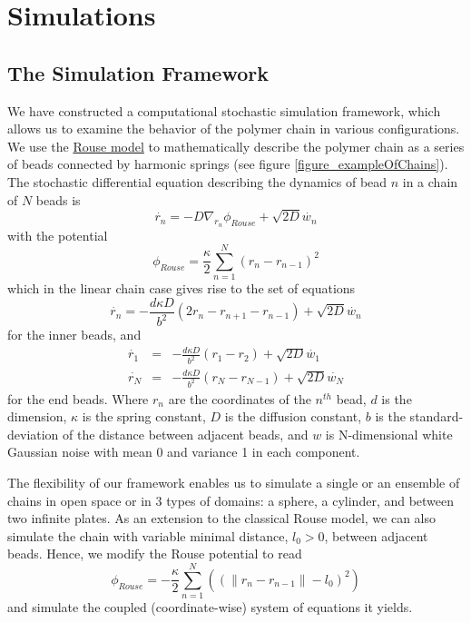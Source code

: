 \documentclass[12pt]{book}
\begin{document}
\chapter{Simulations}
\section{The Simulation Framework}
We have constructed a computational stochastic simulation framework, which allows us to examine the behavior of the polymer chain in various configurations.
We use the \href{http://en.wikipedia.org/wiki/Rouse_model}{Rouse model} to mathematically describe the polymer chain as a series of beads connected by harmonic springs (see figure \ref{figure_exampleOfChains}). The stochastic differential equation describing the dynamics of bead $n$ in a chain of $N$ beads is 
\begin{equation*}
\dot{r_n} = -D\nabla_{r_n}\phi_{Rouse}+\sqrt{2D}\dot{w_n}
\end{equation*}
with the potential 
\begin{equation*}
\phi_{Rouse}=\frac{\kappa}{2}\sum_{n=1}^N \left(r_n-r_{n-1}\right)^2
\end{equation*}
which in the linear chain case gives rise to the set of equations
\begin{equation*}
\dot{r_n}= -\frac{d\kappa D}{b^2}\left(2r_n-r_{n+1}-r_{n-1}\right)+\sqrt{2D}\dot{w_n}
\end{equation*}
for the inner beads, and 
\begin{eqnarray*}
\dot{r_1} &=& -\frac{d\kappa D}{b^2}\left(r_1-r_{2}\right)+\sqrt{2D}\dot{w_1}\\
\dot{r_N} &=& -\frac{d\kappa D}{b^2}\left(r_N-r_{N-1}\right)+\sqrt{2D}\dot{w_N}
\end{eqnarray*} 
for the end beads. Where $r_n$ are the coordinates of the $n^{th}$ bead, $d$ is the dimension, $\kappa$ is the spring constant, $D$ is the diffusion constant, $b$ is the standard-deviation of the distance between adjacent beads, and $w$ is N-dimensional white Gaussian noise with mean 0 and variance 1 in each component. 


The flexibility of our framework enables us to simulate a single or an ensemble of chains in open space or in 3 types of domains: a sphere, a cylinder, and between two infinite plates. As an extension to the classical Rouse model, we can also simulate the chain with variable minimal distance, $l_0>0$, between adjacent beads. Hence, we modify the Rouse potential to read
\begin{equation*}
\phi_{Rouse}=-\frac{\kappa}{2}\sum_{n=1}^N\left((\|r_n-r_{n-1}\|-l_0)^2\right)
\end{equation*}
and simulate the coupled (coordinate-wise) system of equations it yields.
\end{document}

